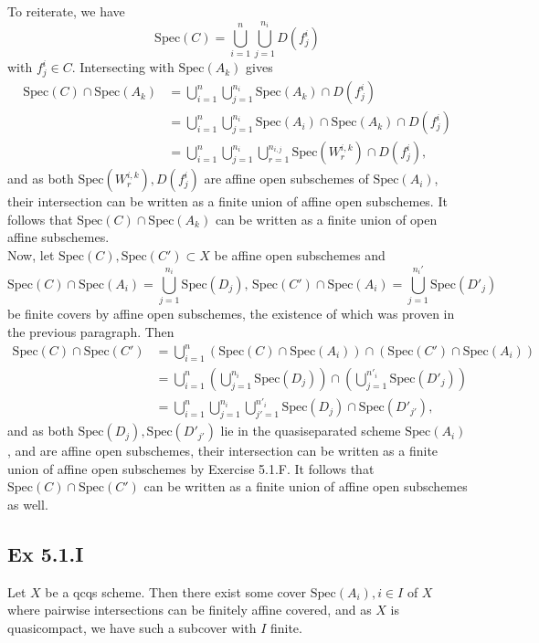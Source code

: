 \documentclass{article}
\theoremstyle{definition}
\newcommand{\Spec}{\text{Spec}}
\begin{document}
To reiterate, we have 
\[
	\Spec(C) 
	= 
	\bigcup_{i = 1}^{n} 
	\bigcup_{j = 1}^{n_i}
	D(f_j^{i})
\] 
with $f_j^{i} \in C$. Intersecting with $\Spec(A_k)$ gives 
\begin{align*}
	\Spec(C) \cap \Spec(A_k)
	&= 
	\bigcup_{i = 1}^{n} 
	\bigcup_{j = 1}^{n_i}
	\Spec(A_k) \cap D(f_j^{i}) \\
	&= 
	\bigcup_{i = 1}^{n} 
	\bigcup_{j = 1}^{n_i}
	\Spec(A_i) \cap \Spec(A_k) \cap D(f_j^{i}) \\
	&= 
	\bigcup_{i = 1}^{n} 
	\bigcup_{j = 1}^{n_i}
	\bigcup_{r = 1}^{n_{i, j}}
	\Spec(W^{i, k}_{r}) \cap D(f_j^{i}),
\end{align*}
and as both $\Spec(W^{i, k}_{r}), D(f_j^{i})$ are affine open subschemes of
$\Spec(A_i)$, their intersection can be written as a finite union of affine
open subschemes. It follows that $\Spec(C) \cap \Spec(A_k)$ can be written as a
finite union of open affine subschemes. \\


Now, let $\Spec(C), \Spec(C') \subset X$ be affine open subschemes and 
\[
	\Spec(C) \cap \Spec(A_i) = \bigcup_{j = 1}^{n_i} \Spec(D_j), \,
	\Spec(C') \cap \Spec(A_i) = \bigcup_{j = 1}^{n_i'} \Spec(D'_j)
\] 
be finite covers by affine open subschemes, the existence of which was proven
in the previous paragraph. Then
\begin{align*}
	\Spec(C) \cap \Spec(C')
	&=
	\bigcup_{i = 1}^{n}
	\left(\Spec(C) \cap \Spec(A_i)\right)
	\cap
	\left(\Spec(C') \cap \Spec(A_i)\right) \\
	&=
	\bigcup_{i = 1}^{n}
	\left(
		\bigcup_{j = 1}^{n_i} \Spec(D_j)
	\right)
	\cap
	\left(
		\bigcup_{j = 1}^{n'_i} \Spec(D'_j)
	\right) \\
	&=
	\bigcup_{i = 1}^{n}
	\bigcup_{j = 1}^{n_i} 
	\bigcup_{j' = 1}^{n'_i} 
	\Spec(D_j)
	\cap
	\Spec(D'_{j'}),
\end{align*} 
and as both $\Spec(D_j), \Spec(D'_{j'})$ lie in the quasiseparated scheme
$\Spec(A_i)$, and are affine open subschemes, their intersection can be written
as a finite union of affine open subschemes by Exercise 5.1.F. It follows that
$\Spec(C) \cap \Spec(C')$ can be written as a finite union of affine open
subschemes as well.


\subsection*{Ex 5.1.I}

Let $X$ be a qcqs scheme. Then there exist some cover $\Spec(A_i), i \in I$ of
$X$ where pairwise intersections can be finitely affine covered, and as $X$ is
quasicompact, we have such a subcover with $I$ finite. \\
\end{document}
